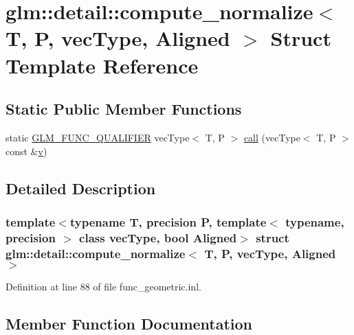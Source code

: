 \hypertarget{structglm_1_1detail_1_1compute__normalize}{}\section{glm\+::detail\+::compute\+\_\+normalize$<$ T, P, vec\+Type, Aligned $>$ Struct Template Reference}
\label{structglm_1_1detail_1_1compute__normalize}
\subsection*{Static Public Member Functions}
\begin{DoxyCompactItemize}
\item 
static \mbox{\hyperlink{setup_8hpp_a33fdea6f91c5f834105f7415e2a64407}{G\+L\+M\+\_\+\+F\+U\+N\+C\+\_\+\+Q\+U\+A\+L\+I\+F\+I\+ER}} vec\+Type$<$ T, P $>$ \mbox{\hyperlink{structglm_1_1detail_1_1compute__normalize_a3c50cc24c57b7cd61d1fb90352699127}{call}} (vec\+Type$<$ T, P $>$ const \&\mbox{\hyperlink{glad_8h_a14cfbe2fc2234f5504618905b69d1e06}{v}})
\end{DoxyCompactItemize}


\subsection{Detailed Description}
\subsubsection*{template$<$typename T, precision P, template$<$ typename, precision $>$ class vec\+Type, bool Aligned$>$\newline
struct glm\+::detail\+::compute\+\_\+normalize$<$ T, P, vec\+Type, Aligned $>$}



Definition at line 88 of file func\+\_\+geometric.\+inl.



\subsection{Member Function Documentation}
\mbox{\label{structglm_1_1detail_1_1compute__normalize_a3c50cc24c57b7cd61d1fb90352699127}} 
